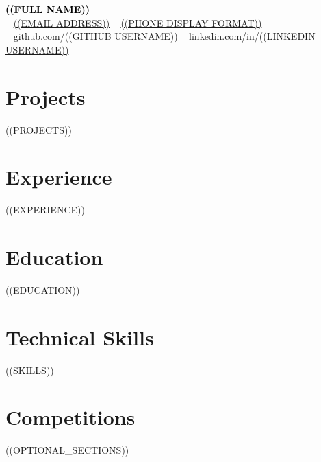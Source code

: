 \documentclass[a4paper,10pt]{article}
\begin{document}
\begin{center}
    {\LARGE \href{((PORTFOLIO URL))}{\textcolor{black}{\textbf{((FULL NAME))}}}} \\[4pt]
    \faEnvelope~ \href{mailto:((EMAIL ADDRESS))}{((EMAIL ADDRESS))} \quad
    ~ \href{tel:((PHONE WITH COUNTRY CODE))}{((PHONE DISPLAY FORMAT))} \\
    \faGithub~ \href{https://github.com/((GITHUB USERNAME))}{github.com/((GITHUB USERNAME))} \quad
    \faLinkedin~ \href{https://www.linkedin.com/in/((LINKEDIN USERNAME))}{linkedin.com/in/((LINKEDIN USERNAME))}
\end{center}

\section*{Projects}
((PROJECTS))

\section*{Experience}
((EXPERIENCE))

\section*{Education}
((EDUCATION))

\section*{Technical Skills}
\begin{itemize}
((SKILLS))
\end{itemize}

\section*{Competitions}
((OPTIONAL_SECTIONS))
\end{document}
